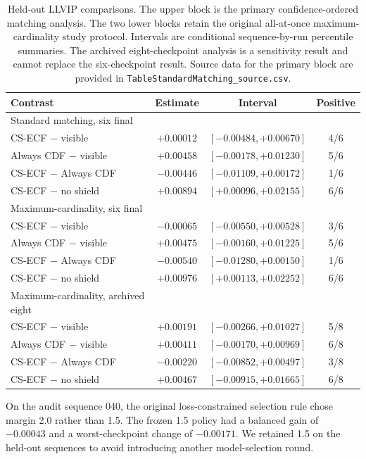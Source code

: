 \documentclass[11pt]{article}
\begin{document}
\begin{table}[ht]
\centering
\scriptsize
\setlength{\tabcolsep}{2pt}
\caption{Held-out LLVIP comparisons. The upper block is the primary
confidence-ordered matching analysis. The two lower blocks retain the original
all-at-once maximum-cardinality study protocol. Intervals are conditional
sequence-by-run percentile summaries. The archived eight-checkpoint analysis
is a sensitivity result and cannot replace the six-checkpoint result. Source
data for the primary block are provided in
\texttt{TableStandardMatching\_source.csv}.}
\label{tab:prospective-llvip}
\begin{tabular}{@{}lccc@{}}
\toprule
Contrast & Estimate & Interval & Positive \\
\midrule
Standard matching, six final & & & \\
CS-ECF \(-\) visible & \(+0.00012\) & \([-0.00484,+0.00670]\) & 4/6 \\
Always CDF \(-\) visible & \(+0.00458\) & \([-0.00178,+0.01230]\) & 5/6 \\
CS-ECF \(-\) Always CDF & \(-0.00446\) & \([-0.01109,+0.00172]\) & 1/6 \\
CS-ECF \(-\) no shield & \(+0.00894\) & \([+0.00096,+0.02155]\) & 6/6 \\
\midrule
Maximum-cardinality, six final & & & \\
CS-ECF \(-\) visible & \(-0.00065\) & \([-0.00550,+0.00528]\) & 3/6 \\
Always CDF \(-\) visible & \(+0.00475\) & \([-0.00160,+0.01225]\) & 5/6 \\
CS-ECF \(-\) Always CDF & \(-0.00540\) & \([-0.01280,+0.00150]\) & 1/6 \\
CS-ECF \(-\) no shield & \(+0.00976\) & \([+0.00113,+0.02252]\) & 6/6 \\
\midrule
Maximum-cardinality, archived eight & & & \\
CS-ECF \(-\) visible & \(+0.00191\) & \([-0.00266,+0.01027]\) & 5/8 \\
Always CDF \(-\) visible & \(+0.00411\) & \([-0.00170,+0.00969]\) & 6/8 \\
CS-ECF \(-\) Always CDF & \(-0.00220\) & \([-0.00852,+0.00497]\) & 3/8 \\
CS-ECF \(-\) no shield & \(+0.00467\) & \([-0.00915,+0.01665]\) & 6/8 \\
\bottomrule
\end{tabular}
\end{table}

On the audit sequence 040, the original loss-constrained selection rule chose
margin 2.0 rather than 1.5. The frozen 1.5 policy had a balanced gain of
\(-0.00043\) and a worst-checkpoint change of \(-0.00171\). We retained 1.5 on
the held-out sequences to avoid introducing another model-selection round.
\end{document}
